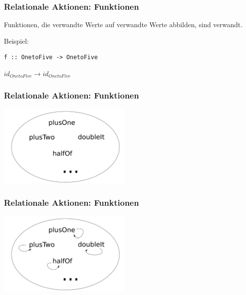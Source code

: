 \documentclass{beamer}
\begin{document}
\begin{frame}[fragile]
\frametitle{Relationale Aktionen: Funktionen}

Funktionen, die verwandte Werte auf verwandte Werte abbilden, sind verwandt.

\vspace{36px}

Beispiel:

\begin{verbatim}
f :: OnetoFive -> OnetoFive
\end{verbatim}

\pause

$id_{OnetoFive} \rightarrow id_{OnetoFive}$

\end{frame}


\begin{frame}
\frametitle{Relationale Aktionen: Funktionen}

\begin{center}
\includegraphics[width=250px]{menge-onetofive-functions}
\end{center}
\end{frame}


\begin{frame}
\frametitle{Relationale Aktionen: Funktionen}

\begin{center}
\includegraphics[width=250px]{relation-onetofive-functions}
\end{center}
\end{frame}
\end{document}
